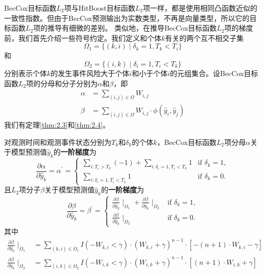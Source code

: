 BecCox目标函数$L_2$项与HitBoost目标函数$L_2$项一样，都是使用相同凸函数近似的一致性指数。但由于BecCox预测输出为实数类型，不再是向量类型，所以它的目标函数$L_2$项的推导有细微的差别。
类似地，在推导BecCox目标函数$L_2$项的梯度前，我们首先介绍一些符号约定。我们定义和个体$k$有关的两个互不相交子集
\begin{equation}
\Omega_1=\{(k,i) \mid \delta_k=1,T_k < T_i\}
\end{equation}
和
\begin{equation}
\Omega_2=\{(i,k) \mid \delta_i=1,T_i < T_k\}
\end{equation}
分别表示个体$k$的发生事件风险大于个体$i$和小于个体$i$的元组集合。设BecCox目标函数$L_2$项的分母和分子分别为$\alpha$和$\beta$，即
\begin{equation}
\begin{split}
\alpha &= \sum_{(i,j)\in \Omega} W_{i,j}\\
\beta &= \sum_{(i,j)\in \Omega} W_{i,j} \cdot \phi\left(\hat{y}_i, \hat{y}_j \right)
\end{split}
\end{equation}
我们有定理\ref{thm:2.3}和\ref{thm:2.4}。

\begin{theorem}\label{thm:2.3}
对观测时间和观测事件状态分别为$T_k$和$\delta_k$的个体$k$，BecCox目标函数$L_2$项分母$\alpha$关于模型预测值$\hat{y}_k$的\textbf{一阶梯度}为$$
\frac{\partial \alpha}{\partial \hat{y}_k}=\alpha^{'}=
\begin{cases}
\sum\limits_{i: T_i>T_k}(-1) + \sum\limits_{i: \delta_i=1,T_i<T_k} 1 & \text{if } \delta_k = 1,\\
\sum\limits_{i: \delta_i=1,T_i<T_k} 1 & \text{if } \delta_k = 0.
\end{cases}
$$ 且$L_2$项分子$\beta$关于模型预测值$\hat{y}_k$的\textbf{一阶梯度}为$$
\frac{\partial \beta}{\partial \hat{y}_k}=\beta^{'}=
\begin{cases}
\frac{\partial \beta}{\partial \hat{y}_k} \mid_{\Omega_1} + \frac{\partial \beta}{\partial \hat{y}_k} \mid_{\Omega_2} & \text{if } \delta_k = 1,\\
\frac{\partial \beta}{\partial \hat{y}_k} \mid_{\Omega_2} & \text{if } \delta_k = 0.
\end{cases}
$$ 其中\[
\begin{split}
\frac{\partial \beta}{\partial \hat{y}_k} \mid_{\Omega_1} &= \sum\limits_{(k,i)\in \Omega_1} {I(-W_{k,i}<\gamma)\cdot (W_{k,i}+\gamma)^{n-1}\cdot [-(n+1)\cdot W_{k,i}-\gamma]} \\
\frac{\partial \beta}{\partial \hat{y}_k} \mid_{\Omega_2} &= \sum\limits_{(i,k)\in \Omega_2} {I(-W_{i,k}<\gamma)\cdot (W_{i,k}+\gamma)^{n-1}\cdot [(n+1)\cdot W_{i,k}+\gamma]}
\end{split}
\]
\end{theorem}

